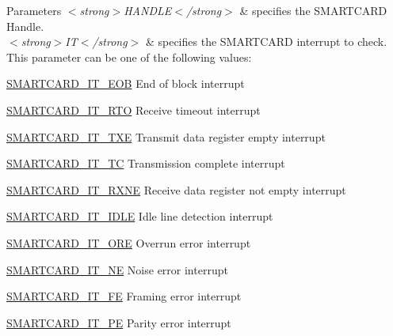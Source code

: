 \begin{DoxyParams}{Parameters}
{\em $<$strong$>$\+H\+A\+N\+D\+L\+E$<$/strong$>$} & specifies the S\+M\+A\+R\+T\+C\+A\+RD Handle. \\
\hline
{\em $<$strong$>$\+I\+T$<$/strong$>$} & specifies the S\+M\+A\+R\+T\+C\+A\+RD interrupt to check. This parameter can be one of the following values\+: \begin{DoxyItemize}
\item \hyperlink{group___s_m_a_r_t_c_a_r_d___interrupt__definition_ga0f1d46faf880c6d17c9156c049206a7c}{S\+M\+A\+R\+T\+C\+A\+R\+D\+\_\+\+I\+T\+\_\+\+E\+OB} End of block interrupt \item \hyperlink{group___s_m_a_r_t_c_a_r_d___interrupt__definition_ga9834b14912101cac858fd7b5de574f02}{S\+M\+A\+R\+T\+C\+A\+R\+D\+\_\+\+I\+T\+\_\+\+R\+TO} Receive timeout interrupt \item \hyperlink{group___s_m_a_r_t_c_a_r_d___interrupt__definition_ga758561a96d28254dc3504cb5325dad1f}{S\+M\+A\+R\+T\+C\+A\+R\+D\+\_\+\+I\+T\+\_\+\+T\+XE} Transmit data register empty interrupt \item \hyperlink{group___s_m_a_r_t_c_a_r_d___interrupt__definition_ga808ee7d7c209374af004e8bf1d2ca492}{S\+M\+A\+R\+T\+C\+A\+R\+D\+\_\+\+I\+T\+\_\+\+TC} Transmission complete interrupt \item \hyperlink{group___s_m_a_r_t_c_a_r_d___interrupt__definition_ga75b6c6e283a114afa1130f6f1bc98da6}{S\+M\+A\+R\+T\+C\+A\+R\+D\+\_\+\+I\+T\+\_\+\+R\+X\+NE} Receive data register not empty interrupt \item \hyperlink{group___s_m_a_r_t_c_a_r_d___interrupt__definition_ga0b1a5f7e611a976c71168a5b9e3a1f0e}{S\+M\+A\+R\+T\+C\+A\+R\+D\+\_\+\+I\+T\+\_\+\+I\+D\+LE} Idle line detection interrupt \item \hyperlink{group___s_m_a_r_t_c_a_r_d___interrupt__definition_gafdbe4b4371bea3dc66f2cc5b9e2353e4}{S\+M\+A\+R\+T\+C\+A\+R\+D\+\_\+\+I\+T\+\_\+\+O\+RE} Overrun error interrupt \item \hyperlink{group___s_m_a_r_t_c_a_r_d___interrupt__definition_ga04cf820da6effba9f284833856ecd105}{S\+M\+A\+R\+T\+C\+A\+R\+D\+\_\+\+I\+T\+\_\+\+NE} Noise error interrupt \item \hyperlink{group___s_m_a_r_t_c_a_r_d___interrupt__definition_gab6e04d30ea8c0ff7c75e4d6cbe687cfa}{S\+M\+A\+R\+T\+C\+A\+R\+D\+\_\+\+I\+T\+\_\+\+FE} Framing error interrupt \item \hyperlink{group___s_m_a_r_t_c_a_r_d___interrupt__definition_gac56e07a71ab82a23930ad58e9a8dc806}{S\+M\+A\+R\+T\+C\+A\+R\+D\+\_\+\+I\+T\+\_\+\+PE} Parity error interrupt \end{DoxyItemize}
\\
\hline
\end{DoxyParams}

